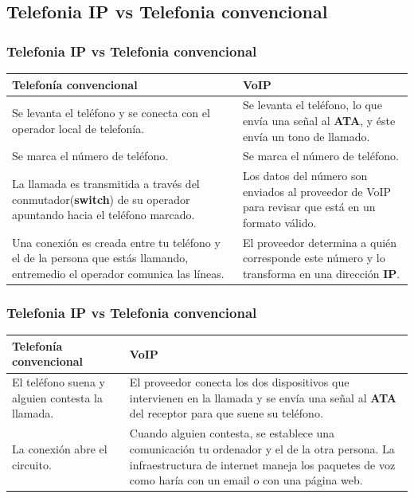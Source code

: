 \documentclass{beamer}
\begin{document}
\subsection{Telefonia IP vs Telefonia convencional}
\begin{frame}
\frametitle{Telefonia IP vs Telefonia convencional}
		\begin{tabular}{|p{5.5cm}|p{5.5cm}|}
		\hline
		\textbf{Telefonía convencional} & \textbf{VoIP} \\
		\hline \hline
		Se levanta el teléfono y se conecta con el operador local de telefonía. & Se levanta el teléfono, lo que envía una señal al \textbf{ATA}, y éste envía un tono de llamado. \\
		\hline
		Se marca el número de teléfono. & Se marca el número de teléfono. \\
		\hline
		La llamada es transmitida a través del conmutador(\textbf{switch}) de su operador apuntando hacia el teléfono marcado. & Los datos del número son enviados al proveedor de VoIP para revisar que está en un formato válido. \\
		\hline
		Una conexión es creada entre tu teléfono y el de la persona que estás llamando, entremedio el operador comunica las líneas. & El proveedor determina a quién corresponde este número y lo transforma en una dirección \textbf{IP}. \\
		\hline
		\end{tabular}
\end{frame}
\begin{frame}
\frametitle{Telefonia IP vs Telefonia convencional}
	\begin{tabular}{|p{5.5cm}|p{5.5cm}|}
				\hline
		\textbf{Telefonía convencional} & \textbf{VoIP} \\
		\hline \hline
		El teléfono suena y alguien contesta la llamada. & El proveedor conecta los dos dispositivos que intervienen en la llamada y se envía una señal al \textbf{ATA} del receptor para que suene su teléfono. \\
		\hline
		La conexión abre el circuito. & Cuando alguien contesta, se establece una comunicación tu ordenador y el de la otra persona. La infraestructura de internet maneja los paquetes de voz como haría con un email o con una página web. \\
		\hline
	\end{tabular}
\end{frame}
\end{document}
